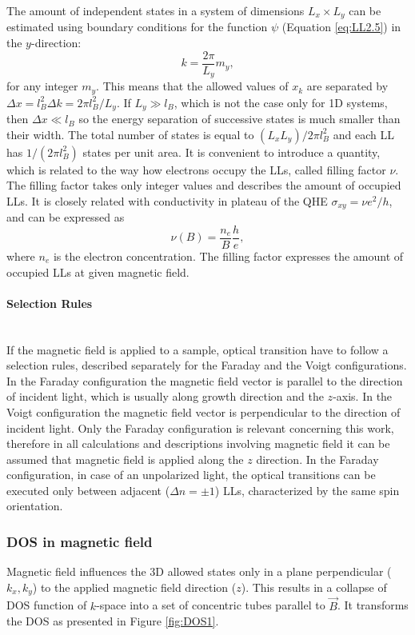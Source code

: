 \documentclass[titlepage,a4paper]{book}
\newcommand{\wciecie}{\quad\phantom{v}}
\newcommand{\myparagraph}[1]{\paragraph{#1}\mbox{}\\}
\begin{document}
The amount of independent states in a system of dimensions $L_x \times L_y$ can be estimated using boundary conditions for the function $\psi$ (Equation \ref{eq:LL2.5}) in the $y$-direction:
\begin{equation}
\label{eq:LL5}
k = \frac{2\pi}{L_y}m_y,
\end{equation}
for any integer $m_y$. This means that the allowed values of $x_k$ are separated by $\Delta x = l_B^2 \Delta k = 2\pi l_B^2/L_y$. If $L_y \gg l_B$, which is not the case only for 1D systems, then $\Delta x \ll l_B$ so the energy separation of successive states is much smaller than their width. The total number of states is equal to $(L_x L_y)/2\pi l_B^2$ and each LL has $1/(2\pi l_B^2)$ states per unit area. It is convenient to introduce a quantity, which is related to the way how electrons occupy the LLs, called filling factor $\nu$. The filling factor takes only integer values and describes the amount of occupied LLs. It is closely related with conductivity in plateau of the QHE $\sigma_{xy} = \nu e^2/h$, and can be expressed as
\begin{equation}
\label{eq:FillingFactor}
\nu (B) = \frac{n_e}{B}\frac{h}{e},
\end{equation}
where $n_e$ is the electron concentration. The filling factor expresses the amount of occupied LLs at given magnetic field.

\myparagraph{Selection Rules}
\wciecie
If the magnetic field is applied to a sample, optical transition have to follow a selection rules, described separately for the Faraday and the Voigt configurations. In the Faraday configuration the magnetic field vector is parallel to the direction of incident light, which is usually along growth direction and the $z$-axis. In the Voigt configuration the magnetic field vector is perpendicular to the direction of incident light. Only the Faraday configuration is relevant concerning this work, therefore in all calculations and descriptions involving magnetic field it can be assumed that magnetic field is applied along the $z$ direction. In the Faraday configuration, in case of an unpolarized light, the optical transitions can be executed only between adjacent ($\Delta n = \pm 1$) LLs, characterized by the same spin orientation.

\subsubsection{DOS in magnetic field}
\wciecie
Magnetic field influences the 3D allowed states only in a plane perpendicular ($k_x,k_y$) to the applied magnetic field direction ($z$). This results in a collapse of DOS function of $k$-space into a set of concentric tubes parallel to $\vec{B}$. It transforms the DOS as presented in Figure \ref{fig:DOS1}. 
\end{document}

